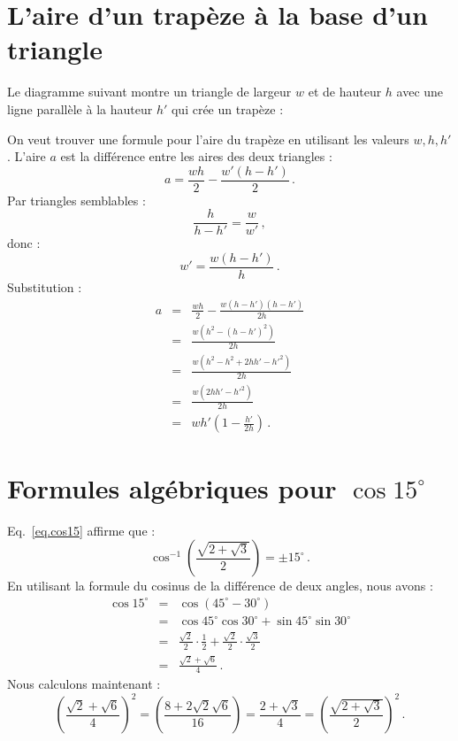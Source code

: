 \section{L'aire d'un trapèze à la base d'un triangle}\label{a.trap}

Le diagramme suivant montre un triangle de largeur $w$ et de hauteur $h$ avec une ligne parallèle à la hauteur $h'$ qui crée un trapèze :

\begin{center}
\end{center}

On veut trouver une formule pour l'aire du trapèze en utilisant les valeurs $w, h, h'$. L'aire $a$ est la différence entre les aires des deux triangles :
\begin{displaymath}
a = \frac{wh}{2} - \frac{w'(h-h')}{2}\,.
\end{displaymath}
Par triangles semblables :
\begin{displaymath}
\frac{h}{h-h'} = \frac{w}{w'}\,,
\end{displaymath}
donc :
\begin{displaymath}
w' = \frac{w(h-h')}{h}\,.
\end{displaymath}
Substitution :
\begin{eqnarray*}
a &=& \frac{wh}{2} - \frac{w(h-h')(h-h')}{2h}\\[8pt]
&=&\frac{w(h^2-(h-h')^2)}{2h}\\[8pt]
&=&\frac{w(h^2-h^2+2hh'-h'^2)}{2h}\\[8pt]
&=&\frac{w(2hh'-h'^2)}{2h}\\[8pt]
&=&wh'(1-\frac{h'}{2h})\,.
\end{eqnarray*}

\section{Formules algébriques pour $\cos 15^{\circ}$}\label{a.cosine}

Eq.~\ref{eq.cos15} affirme que :
\[
\cos^{-1}\left(\frac{\sqrt{2+\sqrt{3}}}{2}\right) = \pm 15^{\circ}\,.
\]
En utilisant la formule du cosinus de la différence de deux angles, nous avons :
\begin{eqnarray*}
\cos 15^\circ &=& \cos(45^\circ-30^\circ)\\
&=& \cos 45^\circ \cos 30^\circ + \sin 45^\circ \sin 30^\circ\\
&=&\frac{\sqrt{2}}{2}\cdot \frac{1}{2} + \frac{\sqrt{2}}{2}\cdot \frac{\sqrt{3}}{2}\\
&=&\frac{\sqrt{2}+\sqrt{6}}{4}\,.
\end{eqnarray*}
Nous calculons maintenant :
\[
\left(\frac{\sqrt{2}+\sqrt{6}}{4}\right)^2 =
\left(\frac{8+2\sqrt{2}\sqrt{6}}{16}\right)=\frac{2+\sqrt{3}}{4}=
\left(\frac{\sqrt{2+\sqrt{3}}}{2}\right)^2\,.
\]
